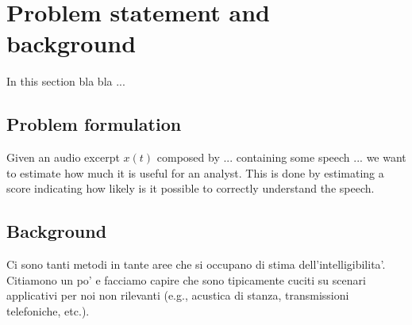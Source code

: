\section{Problem statement and background}

In this section bla bla ...

\subsection{Problem formulation}
Given an audio excerpt $x(t)$ composed by ... containing some speech ... we want to estimate how much it is useful for an analyst.
This is done by estimating a score indicating how likely is it possible to correctly understand the speech.

\subsection{Background}
Ci sono tanti metodi in tante aree che si occupano di stima dell'intelligibilita'.
Citiamono un po' e facciamo capire che sono tipicamente cuciti su scenari applicativi per noi non rilevanti (e.g., acustica di stanza, transmissioni telefoniche, etc.).